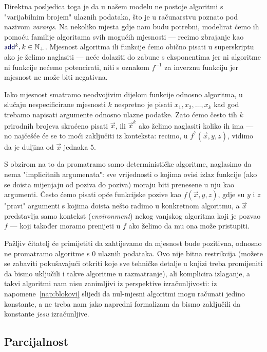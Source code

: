 Direktna posljedica toga je da u našem modelu ne postoje algoritmi s "varijabilnim brojem" ulaznih podataka, što je u računarstvu poznato pod nazivom \emph{varargs}. Na nekoliko mjesta gdje nam budu potrebni, modelirat ćemo ih pomoću familije algoritama svih mogućih mjesnosti --- recimo zbrajanje kao $\f{add}^k,k\in\N_+$. Mjesnost algoritma ili funkcije ćemo obično pisati u superskriptu ako je želimo naglasiti --- neće dolaziti do zabune s eksponentima jer ni algoritme ni funkcije nećemo potencirati, niti s oznakom $f^{-1}$ za inverznu funkciju jer mjesnost ne može biti negativna.

Iako mjesnost smatramo neodvojivim dijelom funkcije odnosno algoritma, u slučaju nespecificirane mjesnosti $k$ nespretno je pisati $x_1,x_2,\dotsc,x_k$ kad god trebamo napisati argumente odnosno ulazne podatke. Zato ćemo često tih $k$ prirodnih brojeva skraćeno pisati $\vec x$, ili $\vec x^k$ ako želimo naglasiti koliko ih ima --- no najčešće će se to moći zaključiti iz konteksta: recimo, u $f^7(\vec x,y,z)$, vidimo da je duljina od $\vec x$ jednaka $5$.

\begin{napomena}[{name=[svi argumenti moraju biti eksplicitno navedeni]}]\label{nap:blokovi}
S obzirom na to da promatramo samo determinističke algoritme, naglasimo da nema "implicitnih argumenata": sve vrijednosti o kojima ovisi izlaz funkcije (ako se doista mijenjaju od poziva do poziva) moraju biti prenesene u nju kao argumenti. Često ćemo pisati opće funkcijske pozive kao $f(\vec x,y,z)$, gdje su $y$ i $z$ "pravi" argumenti s kojima doista nešto radimo u konkretnom algoritmu, a $\vec x$ predstavlja samo kontekst (\emph{environment}) nekog vanjskog algoritma koji je pozvao $f$ --- koji također moramo prenijeti u $f$ ako želimo da mu ona može pristupiti.
\end{napomena}

Pažljiv čitatelj će primijetiti da zahtijevamo da mjesnost bude pozitivna, odnosno ne promatramo algoritme s $0$ ulaznih podataka. Ovo nije bitna restrikcija (možete se zabaviti pokušavajući otkriti koje sve tehničke detalje u knjizi treba promijeniti da bismo uključili i takve algoritme u razmatranje), ali komplicira izlaganje, a takvi algoritmi nam nisu zanimljivi iz perspektive izračunljivosti: iz napomene~\ref{nap:blokovi} slijedi da nul-mjesni algoritmi mogu računati jedino konstante, a ne treba nam jako napredni formalizam da bismo zaključili da konstante \emph{jesu} izračunljive.

\subsection{Parcijalnost}

